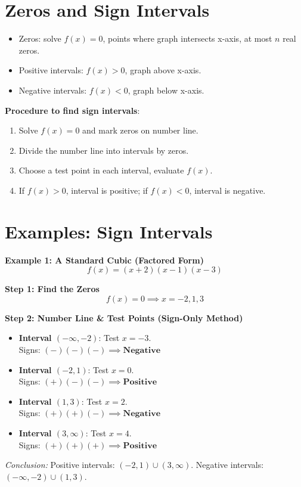 \documentclass[12pt]{article}
\begin{document}
\newpage
\section{Zeros and Sign Intervals}
\begin{itemize}
  \item Zeros: solve $f(x) = 0$, points where graph intersects x-axis, at most $n$ real zeros.
  \item Positive intervals: $f(x) > 0$, graph above x-axis.
  \item Negative intervals: $f(x) < 0$, graph below x-axis.
\end{itemize}

\textbf{Procedure to find sign intervals}:
\begin{enumerate}
  \item Solve $f(x) = 0$ and mark zeros on number line.
  \item Divide the number line into intervals by zeros.
  \item Choose a test point in each interval, evaluate $f(x)$.
  \item If $f(x) > 0$, interval is positive; if $f(x) < 0$, interval is negative.
\end{enumerate}

\section{Examples: Sign Intervals}

\textbf{Example 1: A Standard Cubic (Factored Form)}
\[
  f(x) = (x+2)(x-1)(x-3)
\]

\textbf{Step 1: Find the Zeros}
\[
  f(x) = 0 \implies x = -2, 1, 3
\]

\textbf{Step 2: Number Line \& Test Points (Sign-Only Method)}
\begin{itemize}
  \item \textbf{Interval $(-\infty, -2)$}: Test $x = -3$. \\
  Signs: $(-)(-) (-) \implies \textbf{Negative}$
  
  \item \textbf{Interval $(-2, 1)$}: Test $x = 0$. \\
  Signs: $(+)(-) (-) \implies \textbf{Positive}$
  
  \item \textbf{Interval $(1, 3)$}: Test $x = 2$. \\
  Signs: $(+)(+) (-) \implies \textbf{Negative}$
  
  \item \textbf{Interval $(3, \infty)$}: Test $x = 4$. \\
  Signs: $(+)(+) (+) \implies \textbf{Positive}$
\end{itemize}
\textit{Conclusion:} Positive intervals: $(-2, 1) \cup (3, \infty)$. Negative intervals: $(-\infty, -2) \cup (1, 3)$.
\end{document}
